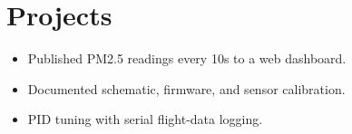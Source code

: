\section{Projects}
\begin{itemize}
  \item Published PM2.5 readings every 10s to a web dashboard.
  \item Documented schematic, firmware, and sensor calibration.
\end{itemize}
\begin{itemize}
  \item PID tuning with serial flight-data logging.
\end{itemize}
